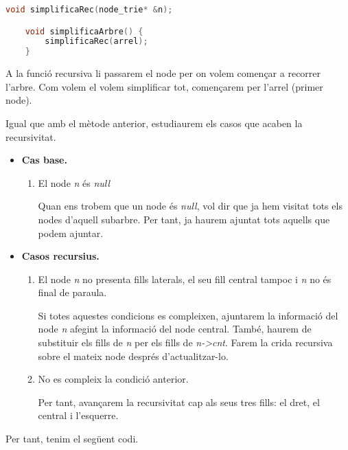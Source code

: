 \documentclass[titlepage]{article}
\begin{document}
\begin{lstlisting}[language=C++]
    void simplificaRec(node_trie* &n);

    void simplificaArbre() {
        simplificaRec(arrel);
    }
\end{lstlisting}

A la funció recursiva li passarem el node per on volem començar a recorrer l'arbre. Com volem el volem simplificar tot, començarem per l'arrel (primer node).
\newline\par
Igual que amb el mètode anterior, estudiaurem els casos que acaben la recursivitat.

\begin{itemize}
    \item \textbf{Cas base.}
    \begin{enumerate}
        \item El node \textit{n} és \textit{null}\par
        Quan ens trobem que un node és \textit{null}, vol dir que ja hem visitat tots els nodes d'aquell subarbre. Per tant, ja haurem ajuntat tots aquells que podem ajuntar.
    \end{enumerate}
    \item \textbf{Casos recursius.}
    \begin{enumerate}
        \item El node \textit{n} no presenta fills laterals, el seu fill central tampoc i \textit{n} no és final de paraula. \par
        Si totes aquestes condicions es compleixen, ajuntarem la informació del node \textit{n} afegint la informació del node central. També, haurem de substituir els fills de \textit{n} per els fills de \textit{n->cnt}. Farem la crida recursiva sobre el mateix node després d'actualitzar-lo.
        \item No es compleix la condició anterior.\par
        Per tant, avançarem la recursivitat cap als seus tres fills: el dret, el central i l'esquerre.
    \end{enumerate}
\end{itemize}

Per tant, tenim el següent codi.
\end{document}
